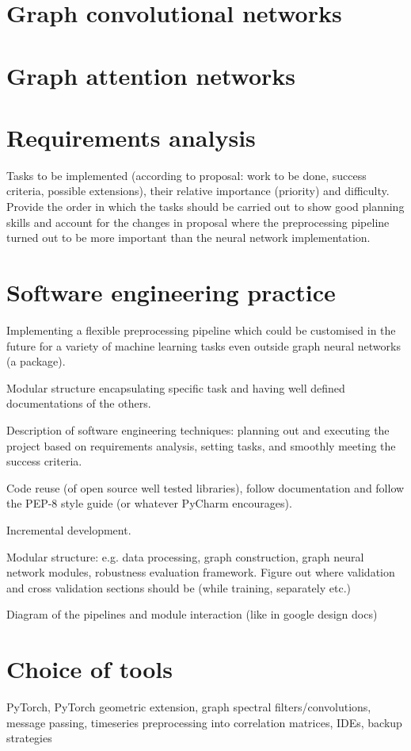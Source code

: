 \section{Graph convolutional networks}

\section{Graph attention networks}

\section{Requirements analysis}

Tasks to be implemented (according to proposal: work to be done, success criteria, possible extensions), their relative importance (priority) and difficulty. Provide the order in which the tasks should be carried out to show good planning skills and account for the changes in proposal where the preprocessing pipeline turned out to be more important than the neural network implementation.

\section{Software engineering practice}
Implementing a flexible preprocessing pipeline which could be customised in the future for a variety of machine learning tasks even outside graph neural networks (a package).

Modular structure encapsulating specific task and having well defined documentations of the others.

Description of software engineering techniques: planning out and executing the project based on requirements analysis, setting tasks, and smoothly meeting the success criteria.

Code reuse (of open source well tested libraries), follow documentation and follow the PEP-8 style guide (or whatever PyCharm encourages).

Incremental development.

Modular structure: e.g. data processing, graph construction, graph neural network modules, robustness evaluation framework. Figure out where validation and cross validation sections should be (while training, separately etc.)

Diagram of the pipelines and module interaction (like in google design docs)


\section{Choice of tools}
PyTorch, PyTorch geometric extension, graph spectral filters/convolutions, message passing, timeseries preprocessing into correlation matrices, IDEs, backup strategies


